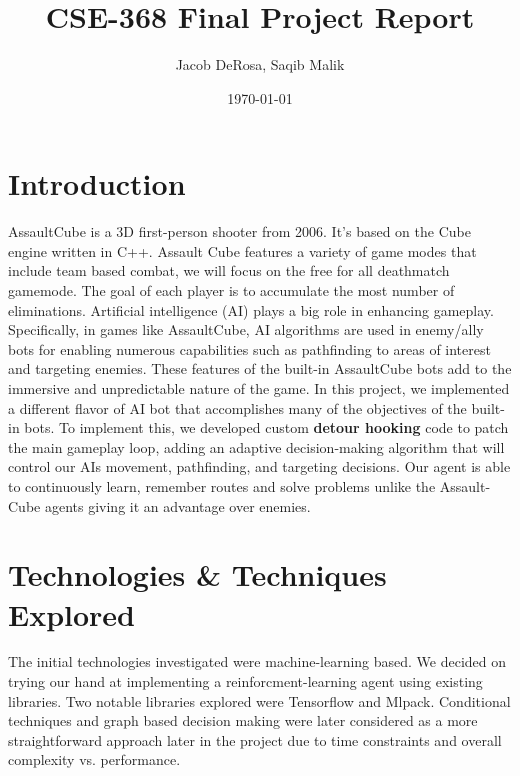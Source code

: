 \documentclass[11pt,a4paper]{article}
\title{CSE-368 Final Project Report}
\author{Jacob DeRosa, Saqib Malik}
\date{\today}
\begin{document}
\maketitle
\tableofcontents
\newpage

\section{Introduction}
AssaultCube is a 3D first-person shooter from 2006. It's based on the Cube engine written in C++. Assault Cube features a variety of game modes that include team based combat, we will focus on the free for all deathmatch gamemode. The goal of each player is to accumulate the most number of eliminations. Artificial intelligence (AI) plays a big role in enhancing gameplay. Specifically, in games like AssaultCube, AI algorithms are used in enemy/ally bots for enabling numerous capabilities such as pathfinding to areas of interest and targeting enemies. These features of the built-in AssaultCube bots add to the immersive and unpredictable nature of the game. In this project, we implemented a different flavor of AI bot that accomplishes many of the objectives of the built-in bots. To implement this, we developed custom \textbf{detour hooking} code to patch the main gameplay loop, adding an adaptive decision-making algorithm that will control our AIs movement, pathfinding, and targeting decisions. Our agent is able to continuously learn, remember routes and solve problems unlike the Assault-Cube agents giving it an advantage over enemies.

\section{Technologies \& Techniques Explored}
The initial technologies investigated were machine-learning based. We decided on trying our hand at implementing a reinforcment-learning agent using existing libraries. Two notable libraries explored were Tensorflow and Mlpack. Conditional techniques and graph based decision making were later considered as a more straightforward approach later in the project due to time constraints and overall complexity vs. performance.
\end{document}

